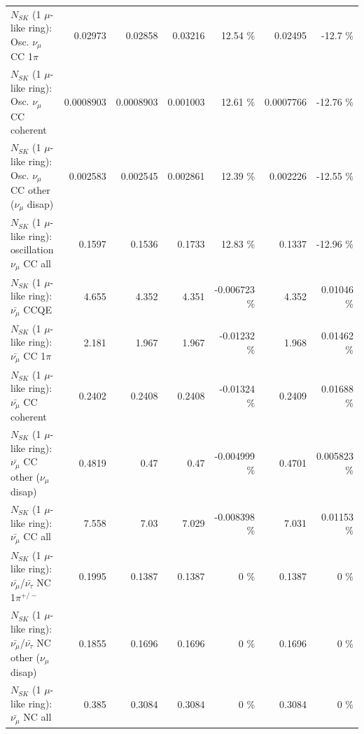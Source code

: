 \begin{table}
\begin{tabular}{| l | r | r | r  r | r  r |}
                          $N_{SK}$ (1 $\mu$-like ring): Osc. $\nu_\mu$ CC 1$\pi$ &         0.02973 &         0.02858 &         0.03216 &    12.54 \%  &         0.02495 &    -12.7 \%  \\ 
                        $N_{SK}$ (1 $\mu$-like ring): Osc. $\nu_\mu$ CC coherent &       0.0008903 &       0.0008903 &        0.001003 &    12.61 \%  &       0.0007766 &   -12.76 \%  \\ 
         $N_{SK}$ (1 $\mu$-like ring): Osc. $\nu_\mu$ CC other ($\nu_\mu$ disap) &        0.002583 &        0.002545 &        0.002861 &    12.39 \%  &        0.002226 &   -12.55 \%  \\ 
                      $N_{SK}$ (1 $\mu$-like ring): oscillation $\nu_\mu$ CC all &          0.1597 &          0.1536 &          0.1733 &    12.83 \%  &          0.1337 &   -12.96 \%  \\ 
\hline
\hline
                              $N_{SK}$ (1 $\mu$-like ring): $\bar{\nu_\mu}$ CCQE &           4.655 &           4.352 &           4.351 & -0.006723 \%  &           4.352 &  0.01046 \%  \\ 
                         $N_{SK}$ (1 $\mu$-like ring): $\bar{\nu_\mu}$ CC 1$\pi$ &           2.181 &           1.967 &           1.967 & -0.01232 \%  &           1.968 &  0.01462 \%  \\ 
                       $N_{SK}$ (1 $\mu$-like ring): $\bar{\nu_\mu}$ CC coherent &          0.2402 &          0.2408 &          0.2408 & -0.01324 \%  &          0.2409 &  0.01688 \%  \\ 
        $N_{SK}$ (1 $\mu$-like ring): $\bar{\nu_\mu}$ CC other ($\nu_\mu$ disap) &          0.4819 &            0.47 &            0.47 & -0.004999 \%  &          0.4701 & 0.005823 \%  \\ 
                          $N_{SK}$ (1 $\mu$-like ring): $\bar{\nu_{\mu}}$ CC all &           7.558 &            7.03 &           7.029 & -0.008398 \%  &           7.031 &  0.01153 \%  \\ 
\hline
  $N_{SK}$ (1 $\mu$-like ring): $\bar{\nu_\mu}$/$\bar{\nu_\tau}$ NC 1$\pi^{+/-}$ &          0.1995 &          0.1387 &          0.1387 &        0 \%  &          0.1387 &        0 \%  \\ 
$N_{SK}$ (1 $\mu$-like ring): $\bar{\nu_\mu}$/$\bar{\nu_\tau}$ NC other ($\nu_\mu$ disap) &          0.1855 &          0.1696 &          0.1696 &        0 \%  &          0.1696 &        0 \%  \\ 
                          $N_{SK}$ (1 $\mu$-like ring): $\bar{\nu_{\mu}}$ NC all &           0.385 &          0.3084 &          0.3084 &        0 \%  &          0.3084 &        0 \%  \\ 

\end{tabular}
\end{table}
